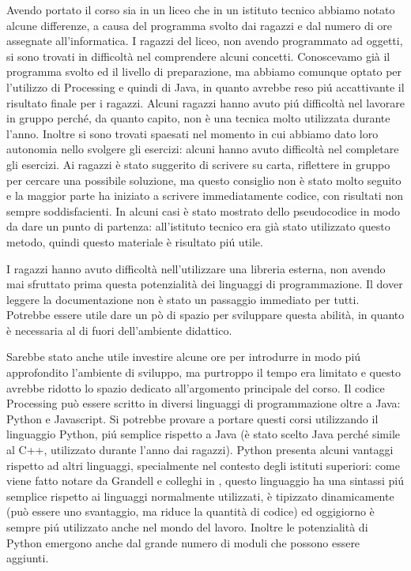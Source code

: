 Avendo portato il corso sia in un liceo che in un istituto tecnico abbiamo notato alcune differenze, a causa del programma svolto dai ragazzi e dal numero di ore assegnate all'informatica. I ragazzi del liceo, non avendo programmato ad oggetti, si sono trovati in difficoltà nel comprendere alcuni concetti. Conoscevamo già il programma svolto ed il livello di preparazione, ma abbiamo comunque optato per l'utilizzo di Processing e quindi di Java, in quanto avrebbe reso piú accattivante il risultato finale per i ragazzi. Alcuni ragazzi hanno avuto piú difficoltà nel lavorare in gruppo perché, da quanto capito, non è una tecnica molto utilizzata durante l'anno. Inoltre si sono trovati spaesati nel momento in cui abbiamo dato loro autonomia nello svolgere gli esercizi: alcuni hanno avuto difficoltà nel completare gli esercizi. Ai ragazzi è stato suggerito di scrivere su carta, riflettere in gruppo per cercare una possibile soluzione, ma questo consiglio non è stato molto seguito e la maggior parte ha iniziato a scrivere immediatamente codice, con risultati non sempre soddisfacienti. In alcuni casi è stato mostrato dello pseudocodice in modo da dare un punto di partenza: all'istituto tecnico era già stato utilizzato questo metodo, quindi questo materiale è risultato piú utile.

I ragazzi hanno avuto difficoltà nell'utilizzare una libreria esterna, non avendo mai sfruttato prima questa potenzialità dei linguaggi di programmazione. Il dover leggere la documentazione non è stato un passaggio immediato per tutti. Potrebbe essere utile dare un pò di spazio per sviluppare questa abilità, in quanto è necessaria al di fuori dell'ambiente didattico.

Sarebbe stato anche utile investire alcune ore per introdurre in modo piú approfondito l'ambiente di sviluppo, ma purtroppo il tempo era limitato e questo avrebbe ridotto lo spazio dedicato all'argomento principale del corso. Il codice Processing può essere scritto in diversi linguaggi di programmazione oltre a Java: Python e Javascript. Si potrebbe provare a portare questi corsi utilizzando il linguaggio Python, piú semplice rispetto a Java (è stato scelto Java perché simile al C++, utilizzato durante l'anno dai ragazzi). Python presenta alcuni vantaggi rispetto ad altri linguaggi, specialmente nel contesto degli istituti superiori: come viene fatto notare da Grandell e colleghi in \cite{python_high_school}, questo linguaggio ha una sintassi piú semplice rispetto ai linguaggi normalmente utilizzati, è tipizzato dinamicamente (può essere uno svantaggio, ma riduce la quantità di codice) ed oggigiorno è sempre piú utilizzato anche nel mondo del lavoro. Inoltre le potenzialità di Python emergono anche dal grande numero di moduli che possono essere aggiunti. 

